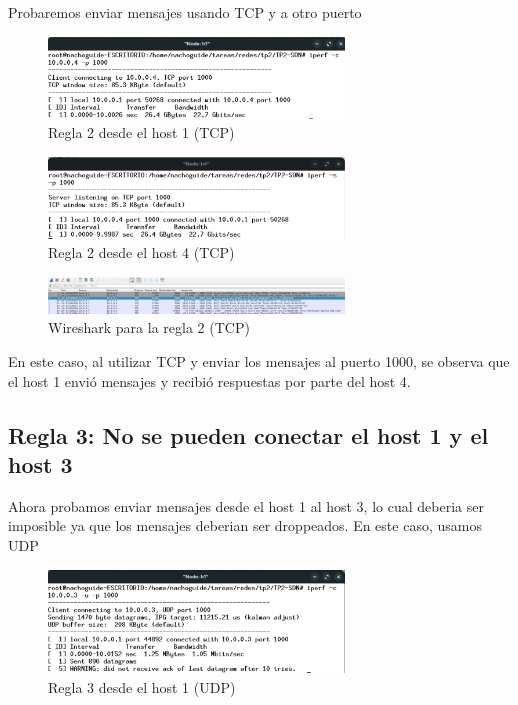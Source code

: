 \documentclass[titlepage,a4paper]{article}
\begin{document}
Probaremos enviar mensajes usando TCP y a otro puerto

\begin{figure}[H]
    \centering
    \includegraphics[width=0.7\textwidth]{img/regla2_h1_tcp.png}
    \caption{Regla 2 desde el host 1 (TCP)}
\end{figure}

\begin{figure}[H]
    \centering
    \includegraphics[width=0.7\textwidth]{img/regla2_h4_tcp.png}
    \caption{Regla 2 desde el host 4 (TCP)}
\end{figure}

\begin{figure}[H]
    \centering
    \includegraphics[width=0.7\textwidth]{img/regla2_wireshark_tcp.png}
    \caption{Wireshark para la regla 2 (TCP)}
\end{figure}

En este caso, al utilizar TCP y enviar los mensajes al puerto 1000, se observa que el host 1 envió mensajes y recibió respuestas por parte del host 4.

\subsection{Regla 3: No se pueden conectar el host 1 y el host 3}
Ahora probamos enviar mensajes desde el host 1 al host 3, lo cual deberia ser imposible ya que los mensajes deberian ser droppeados. En este caso, usamos UDP

\begin{figure}[H]
    \centering
    \includegraphics[width=0.7\textwidth]{img/regla3_h1_udp.png}
    \caption{Regla 3 desde el host 1 (UDP)}
\end{figure}
\end{document}
